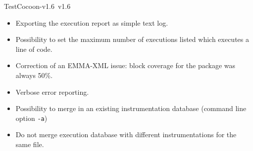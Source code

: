 \begin{TestCocoonDownload}
\begin{ReleaseNote}{TestCocoon-v1.6}{\TestCocoon\ v1.6}
\begin{description}
\begin{itemize}
  \end{itemize}
\item[\cmreport]
  \begin{itemize}
    \item \NewFeature Exporting the execution report as simple text log.
    \item \NewFeature Possibility to set the maximum number of executions listed which executes a line of code.
    \item \BugFix Correction of an EMMA-XML issue: block coverage for the package was always 50\%.
  \end{itemize}
\item[\cmmerge]
  \begin{itemize}
    \item \NewFeature Verbose error reporting.
    \item \NewFeature Possibility to merge in an existing instrumentation database (command line option \verb$-a$)
    \item \BugFix     Do not merge execution database with different instrumentations for the same file.
  \end{itemize}
\end{description}
\end{ReleaseNote}
\end{TestCocoonDownload}



